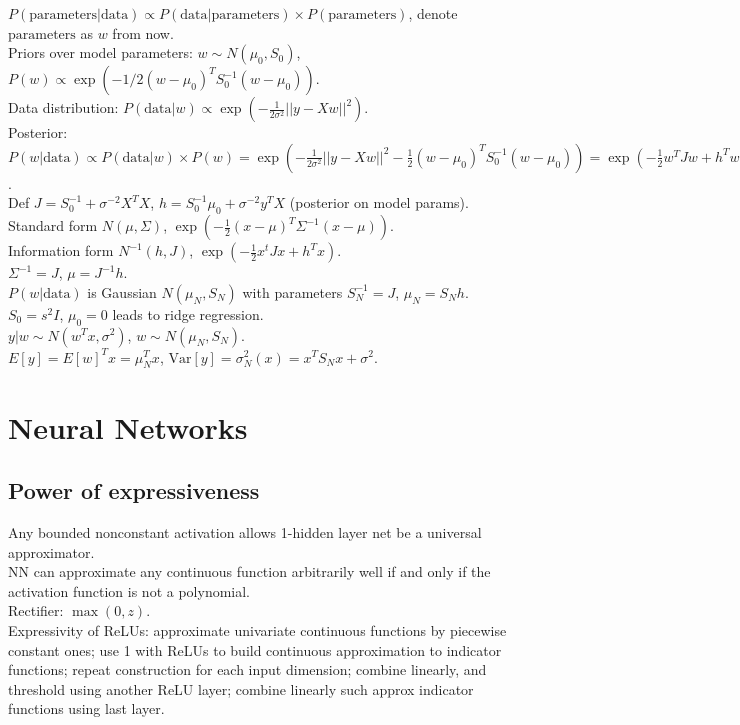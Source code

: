 $P(\text{parameters}|\text{data}) \propto P(\text{data}|\text{parameters}) \times P(\text{parameters})$, denote $\text{parameters}$ as $w$ from now.\\
Priors over model parameters: $w \sim N(\mu_0, S_0)$, $P(w) \propto \exp (-1/2 (w - \mu_0)^T S_0^{-1} (w - \mu_0))$.\\
Data distribution: $P(\text{data}|w) \propto \exp(-\frac{1}{2\sigma^2} ||y - X w||^2)$.\\
Posterior: $P(w|\text{data}) \propto P(\text{data}|w) \times P(w) = \exp(-\frac{1}{2\sigma^2} ||y - X w||^2 - \frac{1}{2}(w - \mu_0)^T S_0^{-1}(w-\mu_0)) = \exp(-\frac{1}{2} w^T J w + h^T w)$.\\
Def $J = S_0^{-1} + \sigma^{-2} X^T X$, $h = S_0^{-1}\mu_0 + \sigma^{-2} y^T X$ (posterior on model params).\\
Standard form $N(\mu, \Sigma)$, $\exp(-\frac{1}{2}(x-\mu)^T\Sigma^{-1}(x-\mu))$.\\
Information form $N^{-1}(h, J)$, $\exp(-\frac{1}{2}x^t J x + h^T x)$.\\
$\Sigma^{-1} = J$, $\mu = J^{-1} h$.\\
$P(w|\text{data})$ is Gaussian $N(\mu_N, S_N)$ with parameters $S_N^{-1} = J$, $\mu_N = S_N h$.\\
$S_0 = s^2I$, $\mu_0 = 0$ leads to ridge regression.\\
$y|w \sim N(w^T x, \sigma^2)$, $w \sim N(\mu_N, S_N)$.\\
$E[y] = E[w]^T x = \mu_N^T x$, $\text{Var}[y] = \sigma_N^2(x) = x^T S_N x + \sigma^2$.

\section{Neural Networks}

\subsection*{Power of expressiveness}

Any bounded nonconstant activation allows 1-hidden layer net be a universal approximator.\\
NN can approximate any continuous function arbitrarily well if and only if the activation function is not a polynomial.\\
Rectifier: $\max(0, z)$.\\
Expressivity of ReLUs: approximate univariate continuous functions by piecewise constant ones; use 1 with ReLUs to build continuous approximation to indicator functions; repeat construction for each input dimension; combine linearly, and threshold using another ReLU layer; combine linearly such approx indicator functions using last layer.

